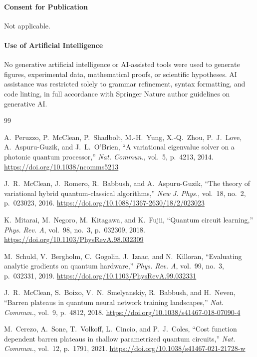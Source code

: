 \documentclass[sn-mathphys,Numbered]{sn-jnl}
\theoremstyle{thmstyleone}
\theoremstyle{thmstyletwo}
\theoremstyle{thmstylethree}
\begin{document}
\paragraph{Consent for Publication}
Not applicable.

\paragraph{Use of Artificial Intelligence}
No generative artificial intelligence or AI-assisted tools were used to generate figures, experimental data, mathematical proofs, or scientific hypotheses. AI assistance was restricted solely to grammar refinement, syntax formatting, and code linting, in full accordance with Springer Nature author guidelines on generative AI.

\begin{thebibliography}{99}
\setlength{\bibsep}{3pt plus 1pt minus 1pt}

A.~Peruzzo, P.~McClean, P.~Shadbolt, M.-H.~Yung, X.-Q.~Zhou, P.~J.~Love, A.~Aspuru-Guzik, and J.~L.~O'Brien,
\newblock ``A variational eigenvalue solver on a photonic quantum processor,''
\newblock \emph{Nat. Commun.}, vol.~5, p.~4213, 2014. \url{https://doi.org/10.1038/ncomms5213}

J.~R.~McClean, J.~Romero, R.~Babbush, and A.~Aspuru-Guzik,
\newblock ``The theory of variational hybrid quantum-classical algorithms,''
\newblock \emph{New J. Phys.}, vol.~18, no.~2, p.~023023, 2016. \url{https://doi.org/10.1088/1367-2630/18/2/023023}

K.~Mitarai, M.~Negoro, M.~Kitagawa, and K.~Fujii,
\newblock ``Quantum circuit learning,''
\newblock \emph{Phys. Rev. A}, vol.~98, no.~3, p.~032309, 2018. \url{https://doi.org/10.1103/PhysRevA.98.032309}

M.~Schuld, V.~Bergholm, C.~Gogolin, J.~Izaac, and N.~Killoran,
\newblock ``Evaluating analytic gradients on quantum hardware,''
\newblock \emph{Phys. Rev. A}, vol.~99, no.~3, p.~032331, 2019. \url{https://doi.org/10.1103/PhysRevA.99.032331}

J.~R.~McClean, S.~Boixo, V.~N.~Smelyanskiy, R.~Babbush, and H.~Neven,
\newblock ``Barren plateaus in quantum neural network training landscapes,''
\newblock \emph{Nat. Commun.}, vol.~9, p.~4812, 2018. \url{https://doi.org/10.1038/s41467-018-07090-4}

M.~Cerezo, A.~Sone, T.~Volkoff, L.~Cincio, and P.~J.~Coles,
\newblock ``Cost function dependent barren plateaus in shallow parametrized quantum circuits,''
\newblock \emph{Nat. Commun.}, vol.~12, p.~1791, 2021. \url{https://doi.org/10.1038/s41467-021-21728-w}


\end{thebibliography}
\end{document}
